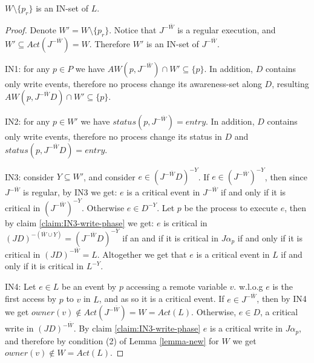 \begin{claim-subsection}
	$W \setminus \{p_r\}$ is an IN-set of $L$.
\end{claim-subsection}

\begin{proof}
	Denote $W' = W \setminus \{p_r\}$. Notice that $J^{-\overline{W}}$ is a regular execution, and $W' \subseteq Act(J^{-\overline{W}}) = W$. Therefore $W'$ is an IN-set of $J^{-\overline{W}}$.
	
	IN1: for any $p \in P$ we have $AW(p,J^{-\overline{W}}) \cap W' \subseteq \{p\}$. In addition, $D$ contains only write events, therefore no process change its awareness-set along $D$, resulting $AW(p,J^{-\overline{W}} D) \cap W' \subseteq \{p\}$.
	
	IN2: for any $p \in W'$ we have $status(p,J^{-\overline{W}}) = entry$.  In addition, $D$ contains only write events, therefore no process change its status in $D$ and $status(p,J^{-\overline{W}} D) = entry$.
	
	IN3: consider $Y \subseteq W'$, and consider $e \in (J^{-\overline{W}} D)^{-Y}$. If $e \in (J^{-\overline{W}})^{-Y}$, then since $J^{-\overline{W}}$ is regular, by IN3 we get: $e$ is a critical event in $J^{-\overline{W}}$ if and only if it is critical in $(J^{-\overline{W}})^{-Y}$. Otherwise $e \in D^{-Y}$. Let $p$ be the process to execute $e$, then by claim \ref{claim:IN3-write-phase} we get: $e$ is critical in $(J D)^{-(\overline{W} \cup Y)} = (J^{-\overline{W}} D)^{-Y}$ if an and if it is critical in $J \alpha_p$ if and only if it is critical in $(J D)^{-\overline{W}} = L$.
	Altogether we get that $e$ is a critical event in $L$ if and only if it is critical in $L^{-Y}$.
	
	IN4: Let $e \in L$ be an event by $p$ accessing a remote variable $v$. w.l.o.g $e$ is the first access by $p$ to $v$ in $L$, and as so it is a critical event. If $e \in J^{-\overline{W}}$, then by IN4 we get $owner(v) \notin Act(J^{-\overline{W}}) = W =Act(L)$. Otherwise, $e \in D$, a critical write in $(J D)^{-\overline{W}}$. By claim \ref{claim:IN3-write-phase} $e$ is a critical write in $J \alpha_p$, and therefore by condition (2) of Lemma \ref{lemma-new} for $W$ we get $owner(v) \notin W = Act(L)$.
	

\end{proof}

